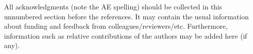 \documentclass[article]{jss}\usepackage{knitr}
\begin{document}
\begin{leftbar}
All acknowledgments (note the AE spelling) should be collected in this
unnumbered section before the references. It may contain the usual information
about funding and feedback from colleagues/reviewers/etc. Furthermore,
information such as relative contributions of the authors may be added here
(if any).
\end{leftbar}







\newpage
\end{document}
